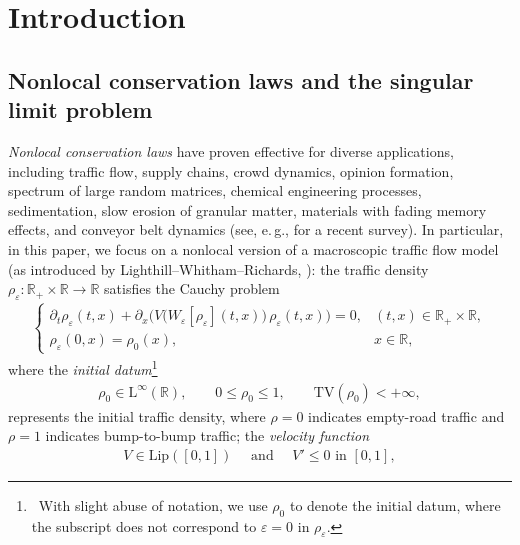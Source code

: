 \documentclass[10pt]{amsart}
\theoremstyle{plain}
\theoremstyle{definition}
\numberwithin{equation}{section}
\newcommand{\lip}{\mathrm{Lip}}
\newcommand{\R}{\mathbb{R}}
\newcommand{\eps}{{\varepsilon}}
\begin{document}
\maketitle


\section{Introduction}
\label{sec:intro}

\subsection{Nonlocal conservation laws and the singular limit problem}
\label{ssec:model}

\textit{Nonlocal conservation laws} have proven effective for diverse applications, including traffic flow, supply chains, crowd dynamics, opinion formation,  spectrum of large random matrices, chemical engineering processes, sedimentation, slow erosion of granular matter, materials with fading memory effects, and conveyor belt dynamics (see, e.\,g., \cite{KEIMER2023} for a recent survey). In particular, in this paper, we focus on a nonlocal version of a macroscopic traffic flow model (as introduced by Lighthill--Whitham--Richards, \cite{MR72606,MR75522}): the traffic density $\rho_\eps: \R_+ \times \R \to \R$ satisfies the Cauchy problem
\begin{align}\label{eq:cle}
\begin{cases}
\partial_t \rho_\eps(t,x)  + \partial_x\Big(V\big(W_{\eps}[\rho_\eps](t,x))\,\rho_\eps(t,x)\Big)   	= 0,	& (t,x)  \in \R_+ \times \R, \\
\rho_\eps(0,x) = \rho_0(x),	&  x\in\R,
\end{cases}
\end{align}
where the \textit{initial datum}\footnote{~With slight abuse of notation, we use $\rho_0$ to denote the initial datum, where the subscript does not correspond to $\eps=0$ in $\rho_\eps$.} 
\begin{align}\label{ass:ic}
    \rho_0 \in \mathrm{L}^\infty(\R), \qquad  0 \leq \rho_0 \leq 1, \qquad \mathrm{TV}(\rho_0) < + \infty,
\end{align}
represents the initial traffic density, where $\rho=0$ indicates empty-road traffic and $\rho=1$ indicates bump-to-bump traffic; 
the \textit{velocity function} 
\begin{align}\label{ass:V}
V \in \lip([0,1]) \quad  \text{ and } \quad V' \leq 0 \text{ in $[0,1]$},
\end{align}
\end{document}
